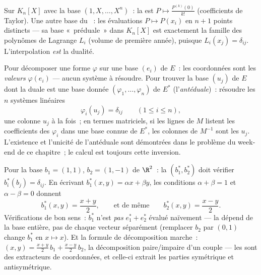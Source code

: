 \begin{example}\label{ex:b2:linalg:dualexamples}
Sur $K_n[X]$ avec la base $(1, X, \dots, X^n)$~: la  est $P
\mapsto \frac{P^{(k)}(0)}{k!}$ (coefficients de Taylor). Une autre base
du ~: les évaluations $P \mapsto P(x_i)$ en $n + 1$ points
distincts --- sa base «~préduale~» dans $K_n[X]$ est exactement la
famille des polynômes de Lagrange $L_i$ (volume de première année),
puisque $L_i(x_j) = \delta_{ij}$. L'interpolation \emph{est} la
dualité.
\end{example}

\begin{method}\label{met:b2:linalg:dualbasis}
Pour décomposer une forme $\varphi$ sur une base $(e_i)$ de $E$~: les
coordonnées sont les \emph{valeurs} $\varphi(e_i)$ --- aucun système à
résoudre. Pour trouver la base $(u_j)$ de $E$ dont la duale est une
base donnée $(\varphi_1, \dots, \varphi_n)$ de $E^*$ (l'\emph{antéduale})~:
résoudre les $n$ systèmes linéaires
\[
\varphi_i(u_j) = \delta_{ij} \qquad (1 \leq i \leq n),
\]
une colonne $u_j$ à la fois~; en termes matriciels, si les lignes de
$M$ listent les coefficients des $\varphi_i$ dans une base connue de
$E^*$, les colonnes de $M^{-1}$ sont les $u_j$. L'existence et
l'unicité de l'antéduale sont démontrées dans le problème du week-end
de ce chapitre~; le calcul est toujours cette inversion.
\end{method}

\begin{example}\label{ex:b2:linalg:dualbasis2d}
Pour la base $b_1 = (1, 1)$, $b_2 = (1, -1)$ de $\R^2$~: la
 $(b_1^*, b_2^*)$ doit vérifier $b_i^*(b_j) =
\delta_{ij}$. En écrivant $b_1^*(x, y) = \alpha x + \beta y$, les
conditions $\alpha + \beta = 1$ et $\alpha - \beta = 0$ donnent
\[
b_1^*(x, y) = \frac{x + y}{2},
\qquad\text{et de même}\qquad
b_2^*(x, y) = \frac{x - y}{2} .
\]
Vérifications de bon sens~: $b_1^*$ n'est \emph{pas} $e_1^* + e_2^*$
évalué naïvement --- la  dépend de la base entière, pas de
chaque vecteur séparément (remplacer $b_2$ par $(0, 1)$ change
$b_1^*$ en $x \mapsto x$). Et la formule de décomposition marche~:
$(x, y) = \frac{x+y}2\,b_1 + \frac{x-y}2\,b_2$, la décomposition
paire/impaire d'un couple --- les  sont des extracteurs
de coordonnées, et celle-ci extrait les parties symétrique et
antisymétrique.
\end{example}

